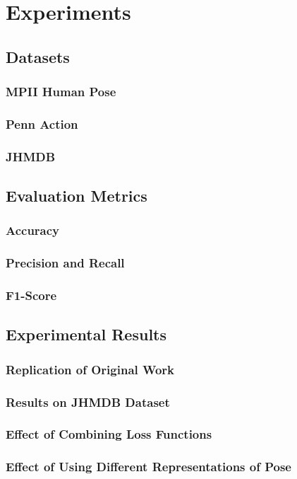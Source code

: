 \chapter{Experiments}

\section{Datasets}
\subsection{MPII Human Pose}
\label{sec:exp-mpii}

\subsection{Penn Action}
\label{sec:exp-penn}

\subsection{JHMDB}
\label{sec:exp-jhmdb}


\section{Evaluation Metrics}
\subsection{Accuracy}

\subsection{Precision and Recall}

\subsection{F1-Score}


\section{Experimental Results}
\subsection{Replication of Original Work}

\subsection{Results on JHMDB Dataset}

\subsection{Effect of Combining Loss Functions}

\subsection{Effect of Using Different Representations of Pose}

